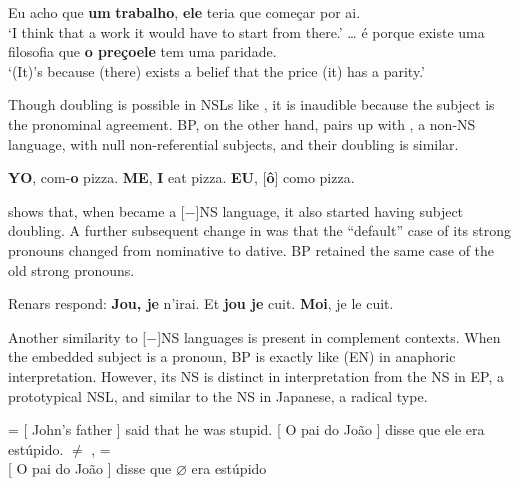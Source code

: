 \documentclass[output=paper]{langsci/langscibook}
\begin{document}
\ea%
    \label{ex:26.45}
    \ea Eu acho que \textbf{um} \textbf{trabalho}\textbf{}, \textbf{ele}\textbf{} teria que começar por ai.\\
    \enquote*{I think that a work it would have to start from there.}
    \ex \dots{} é porque    existe uma filosofia que \textbf{o preço}\textbf{}\textbf{ele}\textbf{} tem uma paridade.\\
    \enquote*{(It)’s because (there) exists a belief     that the price (it) has a parity.}
    \z
\z

Though doubling is possible in \gls{NSL}s like , it is inaudible because
the subject is the pronominal agreement. \gls{BP}, on
the other hand, pairs up with  , a non-NS language, with null
non-referential subjects, and their doubling is similar.\largerpage

\ea%
    \label{ex:26.46}
    \ea \textbf{YO},  com-\textbf{o}  pizza.
    \ex \textbf{ME}, \textbf{I} eat  pizza.
    \ex \textbf{EU}, [\textbf{ô}] como pizza.
    \z
\z

\citet{Roberts1993b} shows that, when  became a [$-$]NS language, it
also started having subject doubling. A further subsequent change in
 was that the “default” case of its strong pronouns changed from
nominative to dative. \gls{BP} retained the same case
of the old strong pronouns.

\ea%
    \label{ex:26.47}
    \ea Renars respond: \textbf{Jou, je} n’irai.
    \ex Et \textbf{jou je} cuit.
    \ex \textbf{Moi}, je le cuit.
    \z
\z

Another similarity to [$-$]NS languages is present in complement contexts. When
the embedded subject is a pronoun, \gls{BP} is exactly
like  (EN) in anaphoric interpretation. However, its NS is
distinct in interpretation from the NS in \gls{EP}, a
prototypical \gls{NSL}, and similar to the NS in
Japanese, a radical type.

\ea%
    \label{ex:26.48} = 
    \ea {}[ John’s father ] said that he was stupid.
    \ex {}[ O pai do João ] disse que ele era
    estúpido.\label{ex:26.48b}
    \z
\ex%
    \label{ex:26.49}  $\neq$ ,  = \\
    {}[ O pai do João ] disse que $\varnothing$ era estúpido
\z
\end{document}
